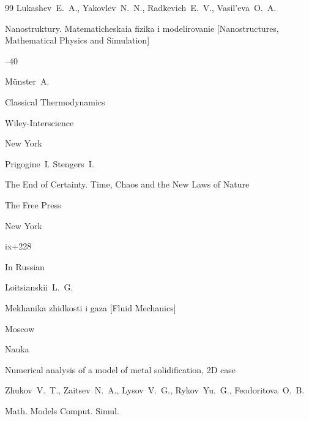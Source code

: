 \begin{thebibliography}{99}
\by Lukashev~E.~A., Yakovlev~N.~N., Radkevich~E.~V., Vasil'eva~O.~A.

\jour Nanostruktury. Matematicheskaia fizika i modelirovanie \rm [Nanostructures, Mathematical Physics and Simulation]




--40






\by M\"unster~A.

\book Classical Thermodynamics


\publ Wiley-Interscience

\publaddr New York






\by Prigogine~I.  Stengers~I.

\book The End of Certainty. Time, Chaos and the New Laws of Nature

\publ The Free Press

\publaddr New York 


\totalpages ix+228








\lang In Russian

\by Loitsianskii~L.~G.

\book Mekhanika zhidkosti i gaza \rm [Fluid Mechanics]

\publaddr Moscow

\publ Nauka







\paper Numerical analysis of a model of metal solidification, 2D case

\by Zhukov~V.~T., Zaitsev~N.~A., Lysov~V.~G., Rykov~Yu.~G., Feodoritova~O.~B.


\jour Math. Models Comput. Simul.


\end{thebibliography}
